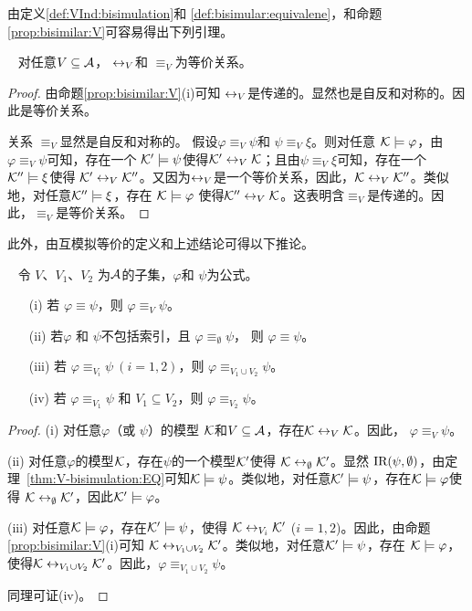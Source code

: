 由定义\ref{def:VInd:bisimulation}和 \ref{def:bisimular:equivalene}，和命题\ref{prop:bisimilar:V}可容易得出下列引理。
\begin{lemma}~\label{lem:eqR}
	对任意$V\subseteq\cal A$，  $\leftrightarrow_V$和 $\equiv_V$为等价关系。
\end{lemma}
\begin{proof}
	由命题\ref{prop:bisimilar:V}(i)可知 $\leftrightarrow_V$是传递的。显然也是自反和对称的。因此是等价关系。
	
	关系 $\equiv_V$显然是自反和对称的。
	假设$\varphi\equiv_V\psi$和 $\psi\equiv_V\xi$。则对任意 ${\cal K}\models\varphi$，由$\varphi\equiv_V\psi$可知，存在一个 ${\cal K}'\models\psi$使得${\cal K}'\leftrightarrow_V{\cal K}$；且由$\psi\equiv_V\xi$可知，存在一个 ${\cal K}''\models\xi$使得
	${\cal K}'\leftrightarrow_V{\cal K}''$。又因为$\leftrightarrow_V$是一个等价关系，因此，${\cal K}\leftrightarrow_V{\cal K}''$。类似地，对任意${\cal K}''\models\xi$，存在 ${\cal K}\models \varphi$ 使得${\cal K}''\leftrightarrow_V{\cal K}$。这表明含$\equiv_V$是传递的。因此，$\equiv_V$是等价关系。
\end{proof} 

此外，由互模拟等价的定义和上述结论可得以下推论。%
\begin{corollary}~\label{cor:eqbi}
	令 $V$、$V_1$、$V_2$ 为$\cal A$的子集，$\varphi$和 $\psi$为公式。
	\begin{itemize}
		\item[(i)] 若 $\varphi\equiv\psi$，则 $\varphi\equiv_V\psi$。
		\item[(ii)] 若$\varphi$ 和 $\psi$不包括索引，且 $\varphi\equiv_\emptyset\psi$， 则 $\varphi\equiv\psi$。
		\item[(iii)] 若 $\varphi\equiv_{V_i}\psi~(i=1,2)$，则 $\varphi\equiv_{V_1\cup V_2}\psi$。
		\item[(iv)] 若 $\varphi\equiv_{V_1}\psi$ 和 $V_1\subseteq V_2$，则 $\varphi\equiv_{V_2}\psi$。
	\end{itemize}
\end{corollary}
\begin{proof}
	(i) 对任意$\varphi$（或 $\psi$）的模型 ${\cal K}$和$V \subseteq {\cal A}$，存在${\cal K} \leftrightarrow_V {\cal K}$。因此， $\varphi\equiv_V\psi$。
	
	(ii) 对任意$\varphi$的模型${\cal K}$，存在$\psi$的一个模型${\cal K}'$使得 ${\cal K} \leftrightarrow_{\emptyset} {\cal K}'$。显然 $\textrm{IR}(\psi, \emptyset)$，由定理~\ref{thm:V-bisimulation:EQ}可知${\cal K} \models \psi$。类似地，对任意${\cal K}' \models \psi$，存在${\cal K} \models \varphi$使得 ${\cal K} \leftrightarrow_{\emptyset} {\cal K}'$，因此${\cal K}'\models \varphi$。
	
	(iii) 对任意${\cal K} \models \varphi$，存在${\cal K}' \models \psi$，使得 ${\cal K} \leftrightarrow_{V_i} {\cal K}'$ ($i=1,2$)。因此，由命题\ref{prop:bisimilar:V}(i)可知 ${\cal K} \leftrightarrow_{V_1\cup V_2} {\cal K}'$。类似地，对任意${\cal K}' \models \psi$，存在 ${\cal K} \models \varphi$，使得${\cal K} \leftrightarrow_{V_1\cup V_2} {\cal K}'$。因此，$\varphi\equiv_{V_1\cup V_2}\psi$。
	
	同理可证(iv)。
\end{proof}

